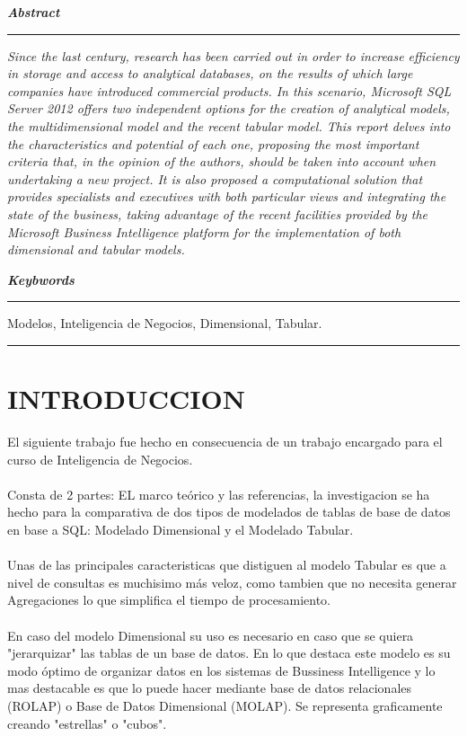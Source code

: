 \documentclass[11pt,a4paper]{article}
\begin{document}
	
	\newpage
	
	\textbf{\textit{\large Abstract}}\rule[1.5mm]{5mm}{0.1mm} 		
	\textit{
		Since the last century, research has been carried out in order to increase efficiency in storage and access to analytical databases, on the results of which large companies have introduced commercial products. In this scenario, Microsoft SQL Server 2012 offers two independent options for the creation of analytical models, the multidimensional model and the recent tabular model. This report delves into the characteristics and potential of each one, proposing the most important criteria that, in the opinion of the authors, should be taken into account when undertaking a new project. It is also proposed a computational solution that provides specialists and executives with both particular views and integrating the state of the business, taking advantage of the recent facilities provided by the Microsoft Business Intelligence platform for the implementation of both dimensional and tabular models.
	}
	
	\vspace{\baselineskip}
	
	\textbf{\textit{\large Keybwords}}\rule[1.5mm]{5mm}{0.1mm} 
	Modelos, Inteligencia de Negocios, Dimensional, Tabular.
	
	
	\rule{167mm}{0.1mm}
	
	\vspace{\baselineskip}
	
	 \section{INTRODUCCION}
	 
	 El siguiente trabajo fue hecho en consecuencia de un trabajo encargado para el curso de Inteligencia de Negocios.\\
	 \\
	 Consta de 2 partes: EL marco teórico y las referencias, la investigacion se ha hecho para la comparativa de dos tipos de modelados de tablas de base de datos en base a SQL: Modelado Dimensional y el Modelado Tabular.\\
	 \\
	 Unas de las principales caracteristicas que distiguen al modelo Tabular es que a nivel de consultas es muchisimo más veloz, como tambien que no necesita generar Agregaciones lo que simplifica el tiempo de procesamiento.\\
	 \\
	 En caso del modelo Dimensional su uso es necesario en caso que se quiera "jerarquizar" las tablas de un base de datos. En lo que destaca este modelo es su modo óptimo de organizar datos en los sistemas de Bussiness Intelligence  y lo mas destacable es que lo puede hacer mediante base de datos relacionales (ROLAP) o Base de Datos Dimensional (MOLAP). Se representa graficamente creando "estrellas" o "cubos".
	 	 
\end{document}
